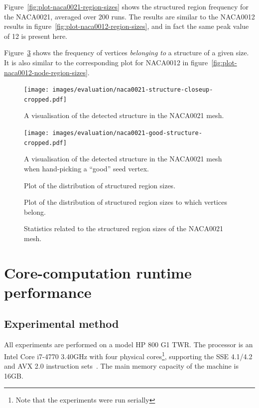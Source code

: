 Figure~\ref{fig:plot-naca0021-region-sizes} shows the structured region frequency for the NACA0021, averaged over 200 runs. The results are similar to the NACA0012 results in figure~\ref{fig:plot-naca0012-region-sizes}, and in fact the same peak value of 12 is present here.

Figure~\ref{fig:plot-naca0021-node-region-sizes} shows the frequency of vertices \emph{belonging to} a structure of a given size. It is also similar to the corresponding plot for NACA0012 in figure~\ref{fig:plot-naca0012-node-region-sizes}.


\begin{figure}
{
\texttt{[image: images/evaluation/naca0021-structure-closeup-cropped.pdf]}
}
\caption{A visualisation of the detected structure in the NACA0021 mesh.}
\label{fig:naca0021-structure}
\end{figure}


\begin{figure}
\texttt{[image: images/evaluation/naca0021-good-structure-cropped.pdf]}
\caption{A visualisation of the detected structure in the NACA0021 mesh when hand-picking a ``good'' seed vertex.}
\label{fig:naca0021-good-structure}
\end{figure}


\begin{figure}
\sidebysidevertical
{

\caption{Plot of the distribution of structured region sizes.}
\label{fig:plot-naca0021-region-sizes}
}
{

\caption{Plot of the distribution of structured region sizes to which vertices belong.}
\label{fig:plot-naca0021-node-region-sizes}
}
\caption{Statistics related to the structured region sizes of the NACA0021 mesh.}
\end{figure}

\section{Core-computation runtime performance}

\subsection{Experimental method}
All experiments are performed on a model HP 800 G1 TWR. The processor is an Intel\textregistered{} Core\texttrademark{} i7-4770 3.40GHz with four physical cores\footnote{Note that the experiments were run serially}, supporting the SSE 4.1/4.2 and  AVX 2.0 instruction sets~\cite{intelprocessor}. The main memory capacity of the machine is 16GB.

